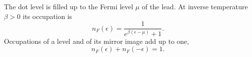 \documentclass{article}
\begin{document}
The dot level is filled up to the Fermi level $\mu$ of the lead. At inverse temperature $\beta>0$ its occupation is
\begin{equation}
n_F(\epsilon) = \frac{1}{e^{\beta(\epsilon-\mu)}+1} .
\label{eq:nf}
\end{equation}
Occupations of a level and of its mirror image add up to one,
\begin{equation}
n_F(\epsilon) + n_F(-\epsilon) = 1 .
\label{eq:ph}
\end{equation}
\end{document}
